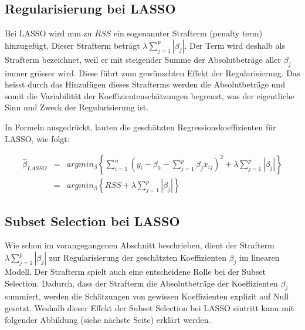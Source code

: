 \documentclass[]{book}
\begin{document}
\subsection{Regularisierung bei LASSO}\label{regularisierung-bei-lasso}

Bei LASSO wird nun zu \(RSS\) ein sogenannter Strafterm (penalty term)
hinzugefügt. Dieser Strafterm beträgt \(\lambda\sum_{j=1}^p|\beta_j|\).
Der Term wird deshalb als Strafterm bezeichnet, weil er mit steigender
Summe der Absolutbeträge aller \(\beta_j\) immer grösser wird. Diese
führt zum gewünschten Effekt der Regularisierung. Das heisst durch das
Hinzufügen dieses Strafterms werden die Absolutbeträge und somit die
Variabilität der Koeffizientenschätzungen begrenzt, was der eigentliche
Sinn und Zweck der Regularisierung ist.

In Formeln ausgedrückt, lauten die geschätzten Regressionskoeffizienten
für LASSO, wie folgt:

\begin{eqnarray}
\hat{\beta}_{LASSO} & = & argmin_{\beta} \left\{\sum_{i=1}^n\left(y_i - \beta_0 - \sum_{j=1}^p \beta_j x_{ij} \right)^2 + \lambda\sum_{j=1}^p|\beta_j| \right\} \nonumber \\
                     & = & argmin_{\beta} \left\{RSS + \lambda\sum_{j=1}^p|\beta_j|\right\}
\label{eq:LsEstimateBetaLASSO}
\end{eqnarray}

\subsection{Subset Selection bei
LASSO}\label{subset-selection-bei-lasso}

Wie schon im vorangegangenen Abschnitt beschrieben, dient der Strafterm
\(\lambda\sum_{j=1}^p|\beta_j|\) zur Regularisierung der geschätzten
Koeffizienten \(\beta_j\) im linearen Modell. Der Strafterm spielt auch
eine entscheidene Rolle bei der Subset Selection. Dadurch, dass der
Strafterm die Absolutbeträge der Koeffizienten \(\beta_j\) summiert,
werden die Schätzungen von gewissen Koeffizienten explizit auf Null
gesetzt. Weshalb dieser Effekt der Subset Selection bei LASSO eintritt
kann mit folgender Abbildung (siehe nächste Seite) erklärt werden.
\end{document}
